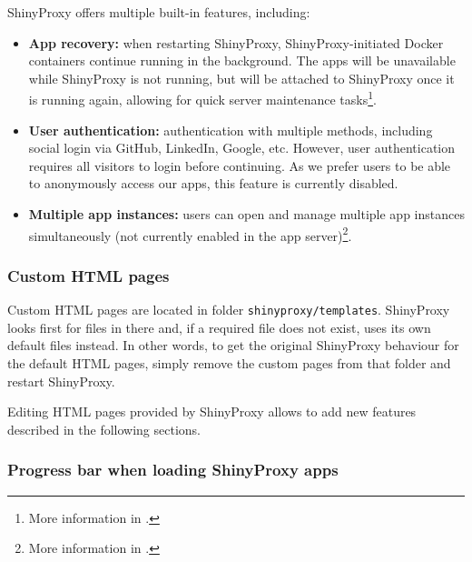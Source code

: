 ShinyProxy offers multiple built-in features, including:

\begin{itemize}
    \item \textbf{App recovery:} when restarting ShinyProxy, ShinyProxy-initiated Docker containers continue running in the background. The apps will be unavailable while ShinyProxy is not running, but will be attached to ShinyProxy once it is running again, allowing for quick server maintenance tasks\footnote{More information in .}.
    \item \textbf{User authentication:} authentication with multiple methods, including social login via GitHub, LinkedIn, Google, etc. However, user authentication requires all visitors to login before continuing. As we prefer users to be able to anonymously access our apps, this feature is currently disabled.
	\item \textbf{Multiple app instances:} users can open and manage multiple app instances simultaneously (not currently enabled in the app server)\footnote{More information in .}.
\end{itemize}

\subsubsection{Custom HTML pages}

Custom HTML pages are located in folder \texttt{shinyproxy/templates}. ShinyProxy looks first for files in there and, if a required file does not exist, uses its own default files instead. In other words, to get the original ShinyProxy behaviour for the default HTML pages, simply remove the custom pages from that folder and restart ShinyProxy.

Editing HTML pages provided by ShinyProxy allows to add new features described in the following sections.

\subsubsection{Progress bar when loading ShinyProxy apps}

